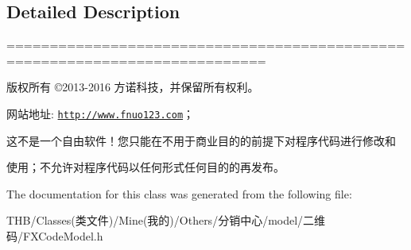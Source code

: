 \subsection{Detailed Description}
============================================================================

版权所有 ©2013-\/2016 方诺科技，并保留所有权利。

网站地址\+: \href{http://www.fnuo123.com}{\tt http\+://www.\+fnuo123.\+com}； 



这不是一个自由软件！您只能在不用于商业目的的前提下对程序代码进行修改和

使用；不允许对程序代码以任何形式任何目的的再发布。 

 

The documentation for this class was generated from the following file\+:\begin{DoxyCompactItemize}
\item 
T\+H\+B/\+Classes(类文件)/\+Mine(我的)/\+Others/分销中心/model/二维码/F\+X\+Code\+Model.\+h\end{DoxyCompactItemize}
